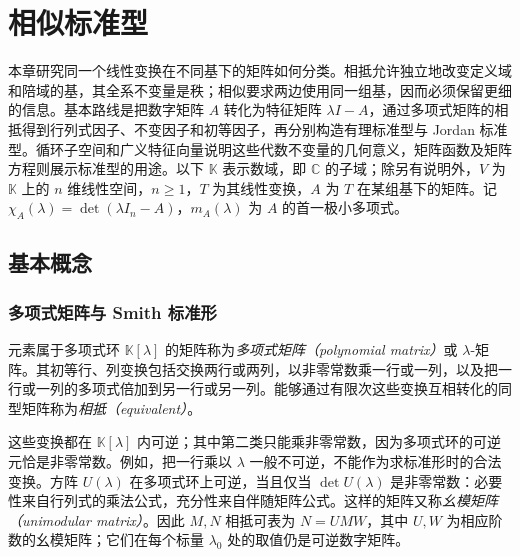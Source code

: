 \setcounter{chapter}{6} %
\chapter{相似标准型}
\label{chap:xie-ex-similarity}

本章研究同一个线性变换在不同基下的矩阵如何分类。相抵允许独立地改变定义域和陪域的基，其全系不变量是秩；相似要求两边使用同一组基，因而必须保留更细的信息。基本路线是把数字矩阵 $A$ 转化为特征矩阵 $\lambda I-A$，通过多项式矩阵的相抵得到行列式因子、不变因子和初等因子，再分别构造有理标准型与 Jordan 标准型。循环子空间和广义特征向量说明这些代数不变量的几何意义，矩阵函数及矩阵方程则展示标准型的用途。以下 $\mathbb K$ 表示数域，即 $\mathbb C$ 的子域；除另有说明外，$V$ 为 $\mathbb K$ 上的 $n$ 维线性空间，$n\geq1$，$T$ 为其线性变换，$A$ 为 $T$ 在某组基下的矩阵。记 $\chi_A(\lambda)=\det(\lambda I_n-A)$，$m_A(\lambda)$ 为 $A$ 的首一极小多项式。

\section{基本概念}
\label{sec:xie-ex-sim-basic}

\subsection{多项式矩阵与 Smith 标准形}
\label{subsec:xie-ex-sim-smith}

\begin{definition}
元素属于多项式环 $\mathbb K[\lambda]$ 的矩阵称为\emph{多项式矩阵（polynomial matrix）}或 $\lambda$-矩阵。其初等行、列变换包括交换两行或两列，以非零常数乘一行或一列，以及把一行或一列的多项式倍加到另一行或另一列。能够通过有限次这些变换互相转化的同型矩阵称为\emph{相抵（equivalent）}。
\end{definition}

这些变换都在 $\mathbb K[\lambda]$ 内可逆；其中第二类只能乘非零常数，因为多项式环的可逆元恰是非零常数。例如，把一行乘以 $\lambda$ 一般不可逆，不能作为求标准形时的合法变换。方阵 $U(\lambda)$ 在多项式环上可逆，当且仅当 $\det U(\lambda)$ 是非零常数：必要性来自行列式的乘法公式，充分性来自伴随矩阵公式。这样的矩阵又称\emph{幺模矩阵（unimodular matrix）}。因此 $M,N$ 相抵可表为 $N=UMW$，其中 $U,W$ 为相应阶数的幺模矩阵；它们在每个标量 $\lambda_0$ 处的取值仍是可逆数字矩阵。

